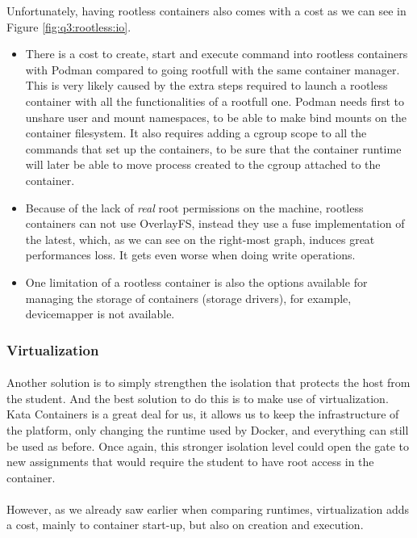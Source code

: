 Unfortunately, having rootless containers also comes with a cost as we can see in Figure \ref{fig:q3:rootless:io}.
\begin{itemize}
  \item There is a cost to create, start and execute command into rootless containers with Podman compared to going rootfull with the same container manager.  This is very likely caused by the extra steps required to launch a rootless container with all the functionalities of a rootfull one.  Podman needs first to unshare user and mount namespaces, to be able to make bind mounts on the container filesystem.  It also requires adding a cgroup scope to all the commands that set up the containers, to be sure that the container runtime will later be able to move process created to the cgroup attached to the container.
  \item Because of the lack of \textit{real} root permissions on the machine, rootless containers can not use OverlayFS, instead they use a fuse implementation of the latest, which, as we can see on the right-most graph, induces great performances loss.  It gets even worse when doing write operations.
  \item One limitation of a rootless container is also the options available for managing the storage of containers (storage drivers), for example, devicemapper is not available.
\end{itemize}

\subsubsection{Virtualization}
\paragraph{}Another solution is to simply strengthen the isolation that protects the host from the student.  And the best solution to do this is to make use of virtualization.  Kata Containers is a great deal for us, it allows us to keep the infrastructure of the platform, only changing the runtime used by Docker, and everything can still be used as before.  Once again, this stronger isolation level could open the gate to new assignments that would require the student to have root access in the container.

\paragraph{}However, as we already saw earlier when comparing runtimes, virtualization adds a cost, mainly to container start-up, but also on creation and execution.

